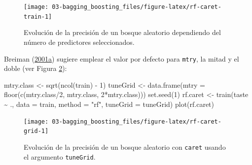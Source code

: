 \documentclass[
]{book}
\newenvironment{Shaded}{\begin{snugshade}}{\end{snugshade}}
\newcommand{\AttributeTok}[1]{\textcolor[rgb]{0.77,0.63,0.00}{#1}}
\newcommand{\DecValTok}[1]{\textcolor[rgb]{0.00,0.00,0.81}{#1}}
\newcommand{\FunctionTok}[1]{\textcolor[rgb]{0.00,0.00,0.00}{#1}}
\newcommand{\NormalTok}[1]{#1}
\newcommand{\OtherTok}[1]{\textcolor[rgb]{0.56,0.35,0.01}{#1}}
\newcommand{\SpecialCharTok}[1]{\textcolor[rgb]{0.00,0.00,0.00}{#1}}
\newcommand{\StringTok}[1]{\textcolor[rgb]{0.31,0.60,0.02}{#1}}
\theoremstyle{break}
\theoremstyle{nonumberplain}
\begin{document}
\begin{figure}[!htb]

{\centering \texttt{[image: 03-bagging\_boosting\_files/figure-latex/rf-caret-train-1]} 

}

\caption{Evolución de la precisión de un bosque aleatorio dependiendo del número de predictores seleccionados.}\label{fig:rf-caret-train}
\end{figure}

Breiman (\protect\hyperlink{ref-breiman2001random}{2001a}) sugiere emplear el valor por defecto para \texttt{mtry}, la mitad y el doble (ver Figura \ref{fig:rf-caret-grid}):



\begin{Shaded}
\begin{Highlighting}[]
\NormalTok{mtry.class }\OtherTok{\textless{}{-}} \FunctionTok{sqrt}\NormalTok{(}\FunctionTok{ncol}\NormalTok{(train) }\SpecialCharTok{{-}} \DecValTok{1}\NormalTok{)}
\NormalTok{tuneGrid }\OtherTok{\textless{}{-}} \FunctionTok{data.frame}\NormalTok{(}\AttributeTok{mtry =} \FunctionTok{floor}\NormalTok{(}\FunctionTok{c}\NormalTok{(mtry.class}\SpecialCharTok{/}\DecValTok{2}\NormalTok{, mtry.class, }\DecValTok{2}\SpecialCharTok{*}\NormalTok{mtry.class)))}
\FunctionTok{set.seed}\NormalTok{(}\DecValTok{1}\NormalTok{)}
\NormalTok{rf.caret }\OtherTok{\textless{}{-}} \FunctionTok{train}\NormalTok{(taste }\SpecialCharTok{\textasciitilde{}}\NormalTok{ ., }\AttributeTok{data =}\NormalTok{ train,}
                  \AttributeTok{method =} \StringTok{"rf"}\NormalTok{, }\AttributeTok{tuneGrid =}\NormalTok{ tuneGrid)}
\FunctionTok{plot}\NormalTok{(rf.caret)}
\end{Highlighting}
\end{Shaded}

\begin{figure}[!htb]

{\centering \texttt{[image: 03-bagging\_boosting\_files/figure-latex/rf-caret-grid-1]} 

}

\caption{Evolución de la precisión de un bosque aleatorio con \texttt{caret} usando el argumento \texttt{tuneGrid}.}\label{fig:rf-caret-grid}
\end{figure}
\end{document}

